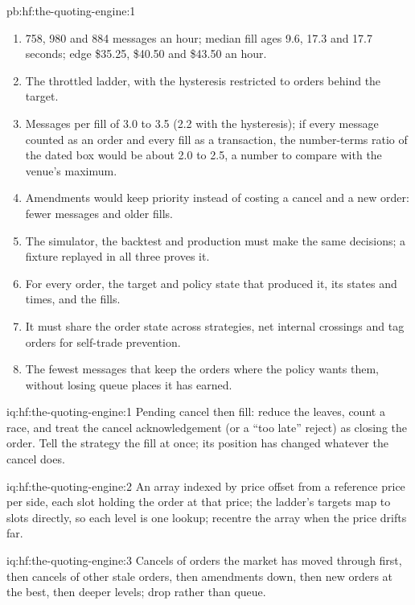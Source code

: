 \begin{solution}{pb:hf:the-quoting-engine:1}
\begin{enumerate}
\item 758, 980 and 884 messages an hour; median fill ages 9.6, 17.3 and 17.7 seconds; edge \$35.25, \$40.50 and \$43.50 an hour.
\item The throttled ladder, with the hysteresis restricted to orders behind the target.
\item Messages per fill of 3.0 to 3.5 (2.2 with the hysteresis); if every message counted as an order and every fill as a transaction, the
number-terms ratio of the dated box would be about 2.0 to 2.5, a number to compare with the venue's maximum.
\item Amendments would keep priority instead of costing a cancel and a new order: fewer messages and older fills.
\item The simulator, the backtest and production must make the same decisions; a fixture replayed in all three proves it.
\item For every order, the target and policy state that produced it, its states and times, and the fills.
\item It must share the order state across strategies, net internal crossings and tag orders for self-trade prevention.
\item The fewest messages that keep the orders where the policy wants them, without losing queue places it has earned.
\end{enumerate}
\end{solution}

\begin{solution}{iq:hf:the-quoting-engine:1}
Pending cancel then fill: reduce the leaves, count a race, and treat the cancel acknowledgement (or a ``too late'' reject) as closing the order.
Tell the strategy the fill at once; its position has changed whatever the cancel does.
\end{solution}

\begin{solution}{iq:hf:the-quoting-engine:2}
An array indexed by price offset from a reference price per side, each slot holding the order at that price; the ladder's targets map to slots
directly, so each level is one lookup; recentre the array when the price drifts far.
\end{solution}

\begin{solution}{iq:hf:the-quoting-engine:3}
Cancels of orders the market has moved through first, then cancels of other stale orders, then amendments down, then new orders at the best, then
deeper levels; drop rather than queue.
\end{solution}

